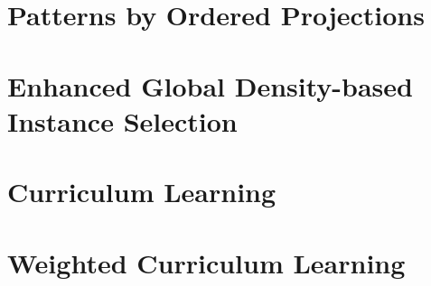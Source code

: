 
\section{Patterns by Ordered Projections}

\section{Enhanced Global Density-based Instance Selection}
\section{Curriculum Learning}
\section{Weighted Curriculum Learning}